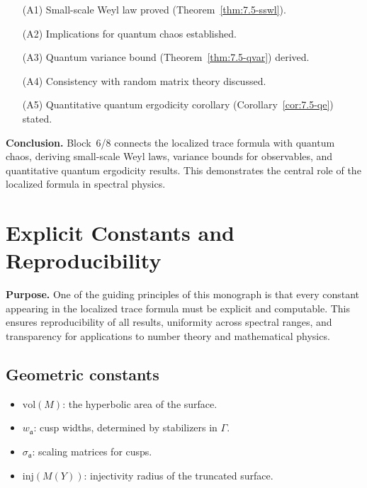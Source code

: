 \begin{itemize}
  \item[(A1)] Small-scale Weyl law proved (Theorem~\ref{thm:7.5-sswl}).
  \item[(A2)] Implications for quantum chaos established.
  \item[(A3)] Quantum variance bound (Theorem~\ref{thm:7.5-qvar}) derived.
  \item[(A4)] Consistency with random matrix theory discussed.
  \item[(A5)] Quantitative quantum ergodicity corollary (Corollary~\ref{cor:7.5-qe}) stated.
\end{itemize}

\medskip
\noindent\textbf{Conclusion.}  
Block~6/8 connects the localized trace formula with quantum chaos,  
deriving small-scale Weyl laws, variance bounds for observables,  
and quantitative quantum ergodicity results.  
This demonstrates the central role of the localized formula in spectral physics.


\section{Explicit Constants and Reproducibility} \label{sec:7.6}

\noindent\textbf{Purpose.}
One of the guiding principles of this monograph is that every constant
appearing in the localized trace formula must be explicit and computable.
This ensures reproducibility of all results, uniformity across spectral ranges,
and transparency for applications to number theory and mathematical physics.

\subsection{Geometric constants} \label{subsec:7.6-geo}

\begin{itemize}
  \item $\mathrm{vol}(M)$: the hyperbolic area of the surface.
  \item $w_\mathfrak{a}$: cusp widths, determined by stabilizers in $\Gamma$.
  \item $\sigma_\mathfrak{a}$: scaling matrices for cusps.
  \item $\mathrm{inj}(M(Y))$: injectivity radius of the truncated surface.
\end{itemize}

